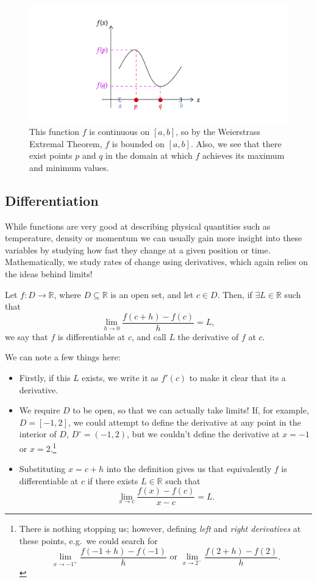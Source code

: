 \documentclass[
  12pt,
  a4paper]{extarticle}
\providecommand{\tightlist}{%
  \setlength{\itemsep}{0pt}\setlength{\parskip}{0pt}}
\theoremstyle{plain}
\theoremstyle{definition}
\theoremstyle{plain}
\theoremstyle{plain}
\theoremstyle{plain}
\theoremstyle{plain}
\theoremstyle{definition}
\theoremstyle{definition}
\theoremstyle{remark}
\theoremstyle{remark}
\let\BeginKnitrBlock\begin \let\EndKnitrBlock\end
\renewcommand{\;}{\,}
\begin{document}
\begin{figure}
\includegraphics[width=\Width,height=\Height]{WET} \caption{This function $f$ is continuous on $[a,b]$, so by the Weierstrass Extremal Theorem, $f$ is bounded on $[a,b]$. Also, we see that there exist points $p$ and $q$ in the domain at which $f$ achieves its maximum and minimum values.}\label{fig:wet}
\end{figure}

\hypertarget{differentiation}{%
\subsection{Differentiation}\label{differentiation}}

While functions are very good at describing physical quantities such as temperature, density or momentum we can usually gain more insight into these variables by studying how fast they change at a given position or time. Mathematically, we study rates of change using derivatives, which again relies on the ideas behind limits!

\BeginKnitrBlock{definition}[Derivative]
{\label{def:def2} }Let \(f: D \to \mathbb{R}\), where \(D \subseteq \mathbb{R}\) is an open set, and let \(c \in D\). Then, if \(\exists L \in \mathbb{R}\) such that \[\lim_{h \to 0}\frac{f(c+h) - f(c)}{h} = L,\] we say that \(f\) is differentiable at \(c\), and call \(L\) the derivative of \(f\) at \(c\).
\EndKnitrBlock{definition}
We can note a few things here:

\begin{itemize}
\tightlist
\item
  Firstly, if this \(L\) exists, we write it as \(f'(c)\) to make it clear that its a derivative.
\item
  We require \(D\) to be open, so that we can actually take limits! If, for example, \(D = [-1,2]\), we could attempt to define the derivative at any point in the interior of \(D\), \(D^{\circ} = (-1,2)\), but we couldn't define the derivative at \(x = -1\) or \(x = 2\).\footnote{There is nothing stopping us; however, defining \emph{left} and \emph{right derivatives} at these points, e.g.~we could search for \[\lim_{x \to -1^{+}}\frac{f(-1+h) - f(-1)}{h}\;\;\text{or}\;\;\lim_{x \to 2^{-}}\frac{f(2+h) - f(2)}{h}.\]}
\item
  Substituting \(x = c+h\) into the definition gives us that equivalently \(f\) is differentiable at \(c\) if there exists \(L\in\mathbb{R}\) such that \[\lim_{x \to c}\frac{f(x) - f(c)}{x - c} = L.\]
\end{itemize}
\end{document}
